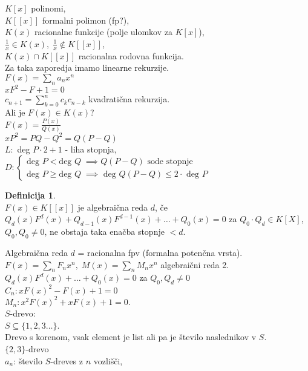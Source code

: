 \documentclass[a4paper, 12pt]{book}
\theoremstyle{definition}
\newtheorem{defn}[counter]{Definicija}
\theoremstyle{remark}
\begin{document}
$K[x]$ polinomi, \\
$K[[x]]$ formalni polimon (fp?), \\
$K(x)$ racionalne funkcije (polje ulomkov za $K[x]$), \\
$\frac{1}{x} \in K(x), \; \frac{1}{x} \notin K[[x]]$, \\
$K(x) \cap K[[x]]$ racionalna rodovna funkcija. \\
Za taka zaporedja imamo linearne rekurzije. \\
$F(x) = \sum_n a_n x^n$ \\
$xF^2 - F + 1 = 0$ \\
$c_{n+1} = \sum_{k=0}^{n} c_k c_{n-k}$ kvadratična rekurzija. \\
Ali je $F(x) \in K(x)$? \\
$F(x) = \frac{P(x)}{Q(x)}$ \\
$xP^2 = PQ - Q^2 = Q(P-Q)$ \\
$L:$ deg $P \cdot 2 + 1$ - liha stopnja, \\
$D: \begin{cases}
  \text{deg } P < \text{deg } Q \; \implies Q(P-Q) \text{ sode stopnje} \\
  \text{deg } P \geq \text{deg } Q \; \implies \text{ deg } Q(P-Q) \leq 2 \cdot \text{ deg } P
\end{cases}$
\begin{defn} \text{} \\
  $F(x) \in K[[x]]$ je algebraična reda $d$, če \\
  $Q_d(x) F^d(x) + Q_{d-1}(x) F^{d-1}(x) + \dots + Q_0(x) = 0$ za $Q_0 \cdot Q_d \in K[X]$,
  $Q_0, Q_0 \neq 0$, ne obstaja taka enačba stopnje $< d$.
\end{defn}
Algebraična reda $d$ = racionalna fpv (formalna potenčna vrsta). \\
$F(x) = \sum_n F_n x^n, \; M(x) = \sum_n M_n x^n$ algebraični reda 2. \\
%
%
%
$Q_d(x) F^d(x) + \dots + Q_0(x) = 0$ za $Q_0, Q_d \neq 0$ \\
$C_n: x F(x)^2 - F(x) + 1 = 0$ \\
$M_n: x^2 F(x)^2 + x F(x) + 1 = 0$. \\
$S$-drevo: \\
$S \subseteq \{1, 2, 3 \dots\}$. \\
Drevo s korenom, vsak element je list ali pa je število naslednikov v $S$. \\
$\{2,3\}$-drevo \\
$a_n$: število $S$-dreves z $n$ vozlišči, \\
\end{document}
